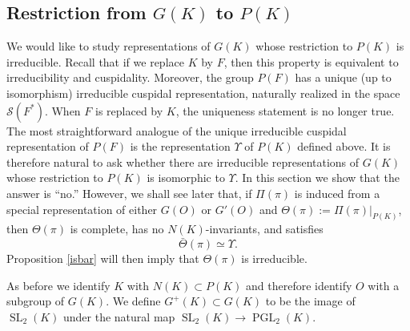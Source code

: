 \documentclass[11pt,a4paper,twoside]{amsart}
\theoremstyle{definition}
\theoremstyle{remark}
\newcommand{\mcS}{\mathcal S}
\newcommand{\SL}{\operatorname{SL}}
\newcommand{\PGL}{\operatorname{PGL}}
\begin{document}
\subsection{Restriction from $G(K)$ to $P(K)$} We would like to study representations of $G(K)$ whose restriction to $P(K)$ is irreducible. Recall that if we replace $K$ by $F$, then this property is equivalent to irreducibility and cuspidality. Moreover, the group $P(F)$ has a unique (up to isomorphism) irreducible cuspidal representation, naturally realized in the space $\mcS(F^*)$. When $F$ is replaced by $K$, the uniqueness statement is no longer true. The most straightforward analogue of the unique irreducible cuspidal representation of $P(F)$ is the representation $\Upsilon$ of $P(K)$ defined above. It is therefore natural to ask whether there are irreducible representations of $G(K)$ whose restriction to $P(K)$ is isomorphic to $\Upsilon$. In this section we show that the answer is ``no.'' However, we shall see later that, if $\Pi(\pi)$ is induced from a special representation of either $G(O)$ or $G'(O)$ and $\Theta(\pi):=\Pi(\pi)|_{P(K)}$, then $\Theta(\pi)$ is complete, has no $N(K)$-invariants, and satisfies
$$
\bar\Theta(\pi)\simeq\Upsilon.
$$
Proposition \ref{isbar} will then imply that $\Theta(\pi)$ is irreducible.

As before we identify $K$ with $N(K)\subset P(K)$ and therefore identify $O$
 with a subgroup of $G(K)$. We define $G^+(K)\subset G(K)$ to be the image of $\SL_2(K)$ under the natural map $\SL_2(K)\to\PGL_2(K)$.
\end{document}

